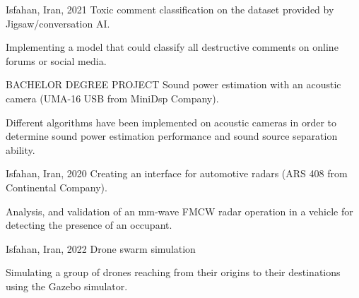 

\begin{cventries}

  \cventry
    {Isfahan, Iran, 2021} %
    {Toxic comment classification on the dataset provided by Jigsaw/conversation AI.} %
    {} %
    {} %
    {
      \begin{cvitems} %
        \item {Implementing a model that could classify all destructive comments on online forums or social media.}
      \end{cvitems}
    }
     \cventry
    {BACHELOR DEGREE PROJECT} %
    {Sound power estimation with an acoustic camera (UMA-16 USB from MiniDsp Company).} %
    {} %
    {} %
    {
      \begin{cvitems} %
        \item {Different algorithms have been implemented on acoustic cameras in order to determine sound power estimation performance and sound source separation ability.}
      \end{cvitems}
    }

  \cventry
    {Isfahan, Iran, 2020 } %
    {Creating an interface for automotive radars (ARS 408 from Continental Company).} %
    {} %
    {} %
    {
      \begin{cvitems} %
        \item {Analysis, and validation of an mm-wave FMCW radar operation in a vehicle for detecting the presence of an occupant.}
      \end{cvitems}
    }

  \cventry
    {Isfahan, Iran, 2022} %
    {Drone swarm simulation} %
    {} %
    {} %
    {
       \begin{cvitems} %
        \item {Simulating a group of drones reaching from their origins to their destinations using the Gazebo simulator.}
      \end{cvitems}
    }


\end{cventries}
